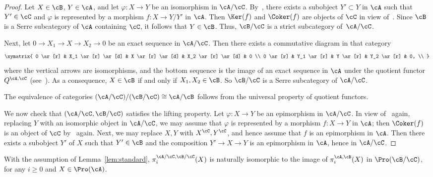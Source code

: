 \begin{proof}
Let $X \in \cB$, $Y \in \cA$, and let $\varphi : X \to Y$ be an isomorphism in $\cA/\cC$. By~\cite[Lem.~2.7]{Br17b}, there exists a subobject $Y' \subset Y$ in $\cA$ such that $Y' \in \cC$ and $\varphi$ is represented by a morphism $f: X \to Y/Y'$ in $\cA$. Then $\Ker(f)$ and $\Coker(f)$ are objects of $\cC$ in view of~\cite[III.1.Lem.~2]{Gabriel}. Since $\cB$ is a Serre subcategory of $\cA$ containing $\cC$, it follows that $Y \in \cB$. Thus, $\cB/\cC$ is a strict subcategory of~$\cA/\cC$.

Next, let $0 \to X_1 \to X \to X_2 \to 0$ be an exact sequence in $\cA/\cC$. Then there exists a commutative diagram in that category
\[
\xymatrix{ 0 \ar[r] & X_1 \ar[r] \ar[d] & X \ar[r] \ar[d] & X_2 \ar[r] \ar[d] & 0 \\
0 \ar[r] & Y_1 \ar[r] & Y \ar[r] & Y_2 \ar[r] & 0, \\
}
\]
where the vertical arrows are isomorphisms, and the bottom sequence is the image of an exact sequence in $\cA$ under the quotient functor $Q^{\cA,\cC}$ (see~\cite[Lem.~2.9]{Br17b}). As a consequence, $X \in \cB$ if and only if $X_1,X_2 \in \cB$. So $\cB/\cC$ is a Serre subcategory of $\cA/\cC$.

The equivalence of categories $(\cA/\cC)/(\cB/\cC) \cong \cA/\cB$ follows from the universal property of quotient functors.

We now check that $(\cA/\cC,\cB/\cC)$ satisfies the lifting property. Let $\varphi : X \to Y$ be an epimorphism in $\cA/\cC$. In view of~\cite[Lem.~2.7]{Br17b} again, replacing $Y$ with an isomorphic object in $\cA/\cC$, we may assume that $\varphi$ is represented by a morphism $f: X \to Y$ in $\cA$; then $\Coker(f)$ is an object of $\cC$ by~\cite[III.1.Lem.~2]{Gabriel} again. Next, we may replace $X,Y$ with $X^{\cC}, Y^{\cC}$, and hence assume that $f$ is an epimorphism in $\cA$. Then there exists a subobject $Y'$ of $X$ such that $Y' \in \cB$ and the composition $Y' \to X \to Y$ is an epimorphism in $\cA$, hence in $\cA/\cC$.
\end{proof}

\begin{lemm}\label{lem:compatible}
With the assumption of Lemma~\ref{lem:standard}, $\pi_i^{\cA/\cC,\cB/\cC}(X)$ is naturally isomorphic to the image of $\pi_i^{\cA, \cB}(X)$ in $\Pro(\cB/\cC)$, for any $i \geq 0$ and $X \in \Pro(\cA)$.
\end{lemm}

